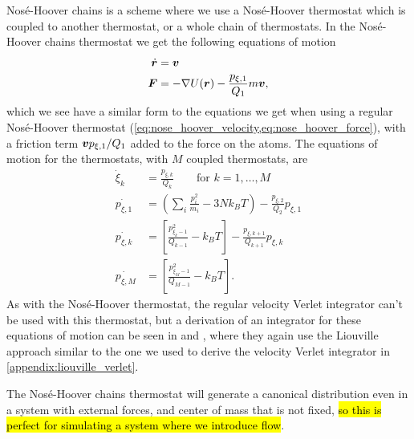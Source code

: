 Nosé-Hoover chains is a scheme where we use a Nosé-Hoover thermostat which is coupled to another thermostat, or a whole chain of thermostats. In the Nosé-Hoover chains thermostat\cite{martyna1992nose} we get the following equations of motion
\begin{align*}
    \dot{\boldsymbol{r}} &= \boldsymbol{v} \\
    \boldsymbol{F} &= -\nabla U(\boldsymbol{r}) - \frac{p_{\xi,1}}{Q_1}m\boldsymbol{v},
\end{align*}
which we see have a similar form to the equations we get when using a regular Nosé-Hoover thermostat (\cref{eq:nose_hoover_velocity,eq:nose_hoover_force}), with a friction term $\boldsymbol{v} p_{\xi,1}/Q_1$ added to the force on the atoms. The equations of motion for the thermostats, with $M$ coupled thermostats, are
\begin{align*}
    \dot \xi_k &= \frac{p_{\xi,k}}{Q_k} \qquad\text{for } k = 1,\dots,M \\
    \dot{p_{\xi,1}} &= \left( \sum_i \frac{p_i^2}{m_i} - 3Nk_BT \right) - \frac{p_{\xi,2}}{Q_2} p_{\xi,1} \\
    \dot{p_{\xi,k}} &= \left[ \frac{p_{\xi_k-1}^2}{Q_{k-1}} - k_BT \right] - \frac{p_{\xi,k+1}}{Q_{k+1}}p_{\xi,k} \\
    \dot{p_{\xi,M}} &= \left[ \frac{p_{\xi_M-1}^2}{Q_{M-1}} - k_BT \right].
\end{align*}
As with the Nosé-Hoover thermostat, the regular velocity Verlet integrator can't be used with this thermostat, but a derivation of an integrator for these equations of motion can be seen in \cite[Appendix E.2.1]{frenkel2001understanding} and \cite{martyna1996explicit}, where they again use the Liouville approach similar to the one we used to derive the velocity Verlet integrator in \cref{appendix:liouville_verlet}.

The Nosé-Hoover chains thermostat will generate a canonical distribution even in a system with external forces, and center of mass that is not fixed\cite[Appendix B.2.2]{frenkel2001understanding}, \hl{so this is perfect for simulating a system where we introduce flow}.


